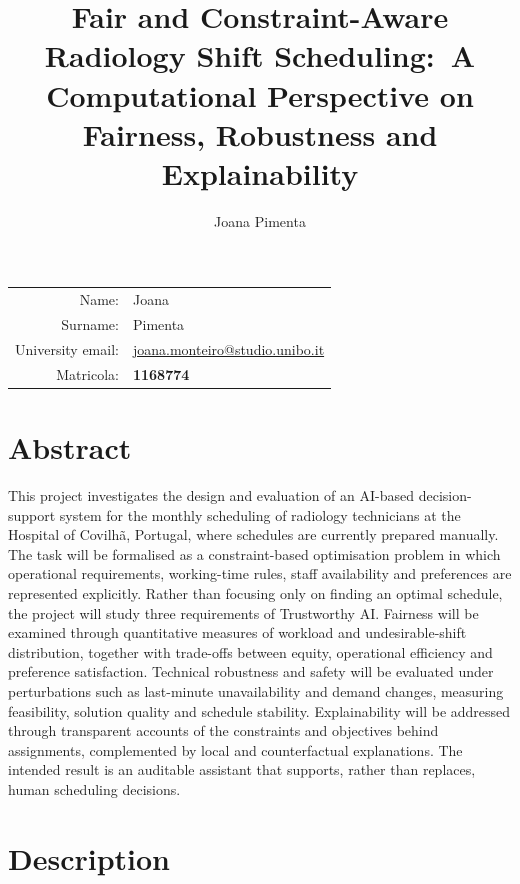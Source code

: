 \documentclass[11pt,a4paper]{article}
\title{Fair and Constraint-Aware Radiology Shift Scheduling:\
A Computational Perspective on Fairness, Robustness and Explainability}
\author{Joana Pimenta}
\date{}
\begin{document}
\maketitle

\begin{center}
\begin{tabular}{rl}
Name: & Joana \\
Surname: & Pimenta \\
University email: & \href{mailto:joana.monteiro@studio.unibo.it}{joana.monteiro@studio.unibo.it} \\
Matricola: & \textbf{1168774} \\
\end{tabular}
\end{center}

\section*{Abstract}

This project investigates the design and evaluation of an AI-based decision-support system for the monthly scheduling of radiology technicians at the Hospital of Covilh\~a, Portugal, where schedules are currently prepared manually. The task will be formalised as a constraint-based optimisation problem in which operational requirements, working-time rules, staff availability and preferences are represented explicitly. Rather than focusing only on finding an optimal schedule, the project will study three requirements of Trustworthy AI. Fairness will be examined through quantitative measures of workload and undesirable-shift distribution, together with trade-offs between equity, operational efficiency and preference satisfaction. Technical robustness and safety will be evaluated under perturbations such as last-minute unavailability and demand changes, measuring feasibility, solution quality and schedule stability. Explainability will be addressed through transparent accounts of the constraints and objectives behind assignments, complemented by local and counterfactual explanations. The intended result is an auditable assistant that supports, rather than replaces, human scheduling decisions.

\section*{Description}
\end{document}
